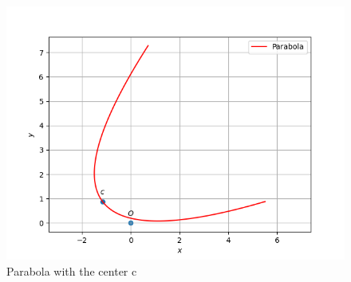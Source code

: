 \begin{enumerate}
\begin{figure}[!ht]
    \centering
    \includegraphics[width=\columnwidth]{./figs/parab/parab_test.png}
    \caption{Parabola with the center c}
    \label{eq:conics/ex/solution/Fig:1}
\end{figure}
\end{enumerate}

